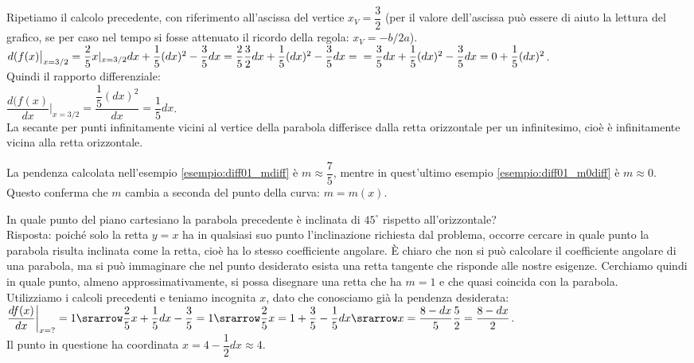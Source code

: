 \begin{esempio}
 \label{esempio:diff01_m0diff}
 Ripetiamo il calcolo precedente, con riferimento all'ascissa del vertice 
 $x_V=\dfrac{3}{2}$ (per il valore dell'ascissa può essere di aiuto la 
lettura
 del grafico, se per caso nel tempo si fosse attenuato il ricordo della
 regola: $x_V=-b/2a$).\\
 $d(f(x)\big|_{x=3/2}=
  \dfrac{2}{5}x|_{x=3/2} dx+\dfrac{1}{5}(dx)^2-\dfrac{3}{5}dx=
  \dfrac{2}{5}\dfrac{3}{2}dx+\dfrac{1}{5}(dx)^2-\dfrac{3}{5}dx=\\
  =\dfrac{3}{5}dx+\dfrac{1}{5}(dx)^2-\dfrac{3}{5}dx=0+\dfrac{1}{5}(dx)^2$.\\
 Quindi il rapporto differenziale:\\
 $\dfrac{d(f(x)}{dx}\bigg|_{x=3/2}=\dfrac{\dfrac{1}{5}(dx)^2}{dx}
 =\dfrac{1}{5}dx$.\\
 La secante per punti infinitamente vicini al vertice della parabola
 differisce dalla retta orizzontale per un infinitesimo, cioè è
 infinitamente vicina alla retta orizzontale.
\end{esempio}

\begin{osservazione}
La pendenza calcolata nell'esempio \ref{esempio:diff01_mdiff} è 
$m\approx\dfrac{7}{5}$, mentre in quest'ultimo esempio 
\ref{esempio:diff01_m0diff} è
$m\approx 0$. Questo conferma che $m$ cambia a seconda del punto della 
curva: 
$m=m(x)$.
\end{osservazione}

\begin{esempio}
 In quale punto del piano cartesiano la parabola precedente è inclinata 
 di $45^\circ$ rispetto all'orizzontale?\\
 Risposta: poiché solo la retta $y=x$ ha in qualsiasi suo punto
 l'inclinazione richiesta dal problema, occorre cercare in quale punto
 la parabola risulta inclinata come la retta, cioè ha lo stesso 
coefficiente 
 angolare. È chiaro che non si può calcolare il coefficiente angolare
 di una parabola, ma si può immaginare che nel punto desiderato esista una 
retta
 tangente che risponde alle nostre esigenze. Cerchiamo quindi in quale
 punto, almeno approssimativamente, si possa disegnare una retta che ha 
$m=1$ e
 che quasi coincida con la parabola.\\
 Utilizziamo i calcoli precedenti e teniamo incognita $x$, dato che 
conosciamo
 già la pendenza desiderata:\\
 $\dfrac{df(x)}{dx}\bigg|_{x=?}=1 \srarrow 
 \dfrac{2}{5}x+\dfrac{1}{5}dx-\dfrac{3}{5}=1
 \srarrow \dfrac{2}{5}x=1+\dfrac{3}{5}-\dfrac{1}{5}dx
 \srarrow x=\dfrac{8-dx}{5}\dfrac{5}{2}=\dfrac{8-dx}{2}$.\\
 Il punto in questione ha coordinata $x= 4-\dfrac{1}{2}dx\approx 4$.  
\end{esempio}

